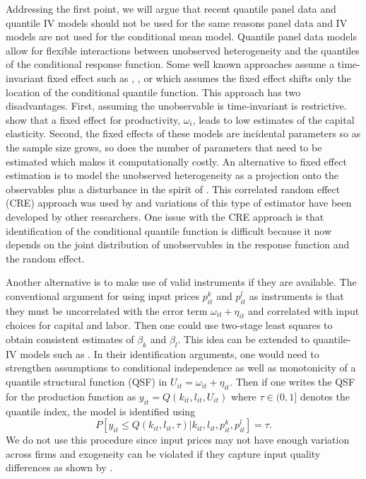 \documentclass[11pt]{article}
\begin{document}
Addressing the first point, we will argue that recent quantile panel data and quantile IV models should not be used for the same reasons panel data and IV models are not used for the conditional mean model. Quantile panel data models allow for flexible interactions between unobserved heterogeneity and the quantiles of the conditional response function. Some well known approaches assume a time-invariant fixed effect such as \cite{Koenker2004}, \cite{Lamarche2010}, or \cite{Canay2011} which assumes the fixed effect shifts only the location of the conditional quantile function. This approach has two disadvantages. First, assuming the unobservable is time-invariant is restrictive. \cite{Griliches1986} show that a fixed effect for productivity, $\omega_{i}$, leads to low estimates of the capital elasticity. Second, the fixed effects of these models are incidental parameters so as the sample size grows, so does the number of parameters that need to be estimated which makes it computationally costly. An alternative to fixed effect estimation is to model the unobserved heterogeneity as a projection onto the observables plus a disturbance in the spirit of \cite{Chamberlain1984}. This correlated random effect (CRE) approach was used by \cite{Abrevaya2008} and variations of this type of estimator have been developed by other researchers. One issue with the CRE approach is that identification of the conditional quantile function is difficult because it now depends on the joint distribution of unobservables in the response function and the random effect.

Another alternative is to make use of valid instruments if they are available. The conventional argument for using input prices $p^{k}_{it}$ and $p^{l}_{it}$ as instruments is that they must be uncorrelated with the error term $\omega_{it}+\eta_{it}$ and correlated with input choices for capital and labor. Then one could use two-stage least squares to obtain consistent estimates of $\beta_{k}$ and $\beta_{l}$. This idea can be extended to quantile-IV models such as \cite{Chernozhukov2005}. In their identification arguments, one would need to strengthen assumptions to conditional independence as well as monotonicity of a quantile structural function (QSF) in $U_{it}=\omega_{it}+\eta_{it}$. Then if one writes the QSF for the production function as $y_{it}=Q(k_{it}, l_{it}, U_{it})$ where $\tau\in (0,1]$ denotes the quantile index, the model is identified using
\begin{equation}
P[y_{it}\leq Q(k_{it}, l_{it}, \tau)|k_{it}, l_{it}, p^{k}_{it}, p^{l}_{it}]=\tau.
\end{equation}
We do not use this procedure since input prices may not have enough variation across firms and exogeneity can be violated if they capture input quality differences as shown by \cite{Griliches1986}.
\end{document}
